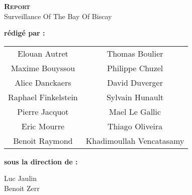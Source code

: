 
\begingroup
\thispagestyle{empty}
\begin{center}
\vspace*{2cm}
{\Huge \textsc{\textbf{Report}}}\\


\vspace*{2cm}
{\huge Surveillance Of The Bay Of Biscay}\par %
\end{center}


\vspace*{4cm}
\textbf{\LARGE rédigé par :} 
\begin{center}
{\LARGE
\begin{tabular}{cc}
Elouan Autret & Thomas Boulier\\
Maxime Bouyssou & Philippe Chuzel\\
Alice Danckaers & David Duverger\\
Raphael Finkelstein & Sylvain Hunault\\
Pierre Jacquot & Mael Le Gallic\\
Eric Mourre & Thiago Oliveira\\
Benoit Raymond & Khadimoullah Vencatasamy\\
\end{tabular}}
\end{center}


\vspace*{1.5 cm}
{\LARGE \textbf{sous la direction de :}}\\
\begin{center}
{\LARGE
Luc Jaulin\\
Benoit Zerr\\}
\end{center}
\endgroup
